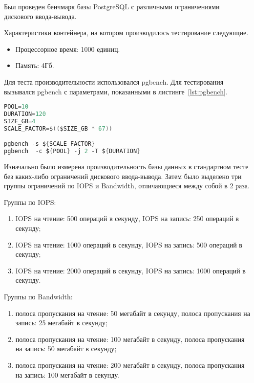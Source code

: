 Был проведен бенчмарк базы PostgreSQL с различными ограничениями дискового ввода-вывода. 

Характеристики контейнера, на котором производилось тестирование следующие.

\begin{itemize}
	\item Процессорное время: 1000 единиц.
	\item Память: 4Гб.
\end{itemize}

Для теста производительности использовался pgbench. Для тестирования вызывался pgbench с параметрами, показанными в листинге~\ref{lst:pgbench}.

\begin{lstlisting}[language=Go,label=lst:pgbench, caption={Параметры pgbench}]
POOL=10
DURATION=120
SIZE_GB=4
SCALE_FACTOR=$(($SIZE_GB * 67))

pgbench -s ${SCALE_FACTOR}
pgbench  -c ${POOL} -j 2 -T ${DURATION}
\end{lstlisting}

Изначально было измерена производительность базы данных в стандартном тесте без каких-либо ограничений дискового ввода-вывода. Затем было выделено три группы ограничений по IOPS и Bandwidth, отличающиеся между собой в 2 раза.

Группы по IOPS:

\begin{enumerate}
	\item IOPS на чтение: 500 операций в секунду, IOPS на запись: 250 операций в секунду;
	\item IOPS на чтение: 1000 операций в секунду, IOPS на запись: 500 операций в секунду;
	\item IOPS на чтение: 2000 операций в секунду, IOPS на запись: 1000 операций в секунду.
\end{enumerate}

Группы по Bandwidth:

\begin{enumerate}
	\item полоса пропускания на чтение: 50 мегабайт в секунду, полоса пропускания на запись: 25 мегабайт в секунду;
	\item полоса пропускания на чтение: 100 мегабайт в секунду, полоса пропускания на запись: 50 мегабайт в секунду;
	\item полоса пропускания на чтение: 200 мегабайт в секунду, полоса пропускания на запись: 100 мегабайт в секунду.
\end{enumerate}

